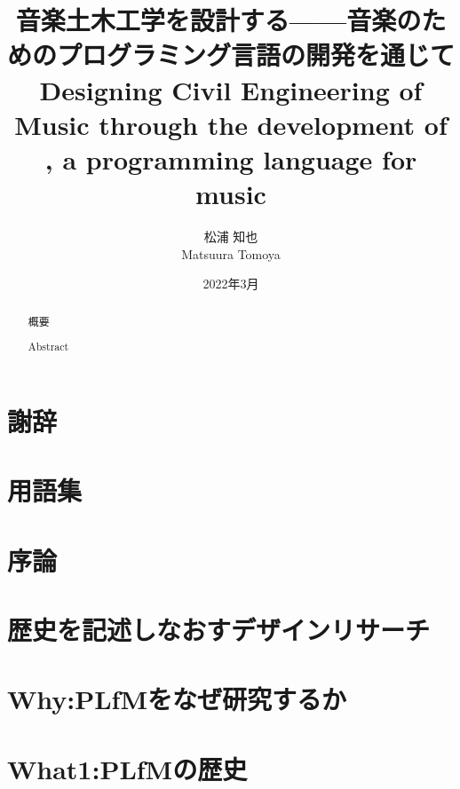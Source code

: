 \documentclass[dvipdfmx,a4paper,openany]{jsbook}
\title{音楽土木工学を設計する——音楽のためのプログラミング言語\mimium{}の開発を通じて\\
Designing Civil Engineering of Music through the development of \mimium{}, a programming language for music
}
\author{松浦 知也 \\
        Matsuura Tomoya}
\date{2022年3月}
\begin{document}
\maketitle

\begin{abstract}
\chapter*{概要}
    
\chapter*{Abstract}
    
\end{abstract}

\chapter*{謝辞}


\setcounter{tocdepth}{3}
\tableofcontents

\chapter*{用語集}


\listoffigures
\renewcommand\lstlistlistingname{コード例目次}
\lstlistoflistings

\chapter{序論}


\chapter{歴史を記述しなおすデザインリサーチ}


\chapter{Why:PLfMをなぜ研究するか}


\chapter{What1:PLfMの歴史}

\end{document}
